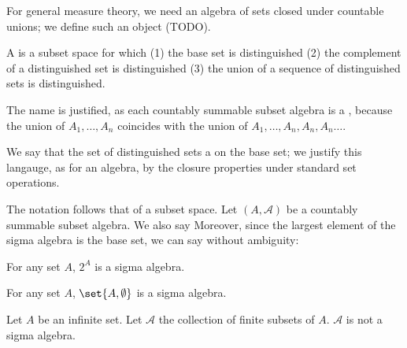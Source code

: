 
\sbasic



\sstart



For general measure theory,
we need an algebra of sets
closed under countable unions;
we define such an object (TODO).


A 
is a subset space for which
(1) the base set is distinguished
(2) the complement of a distinguished
set is distinguished
(3) the union of a sequence of distinguished sets
is distinguished.

The name is justified, as
each countably summable subset algebra is a
,
because the union of $A_1, \dots, A_n$
coincides with the union of
$A_1, \dots, A_n, A_n, A_n \dots$.

We say that the set of distinguished
sets a  on the
base set; we justify this langauge, as for
an algebra, by the closure properties
under standard set operations.


The notation follows that of a subset space.
Let $(A, \mathcal{A})$ be a countably summable
subset algebra.
We also say 
Moreover, since the largest element of the
sigma algebra is the base set, we can say without
ambiguity: 


\begin{expl}
  For any set $A$, $2^{A}$ is a sigma algebra.
\end{expl}

\begin{expl}
  For any set $A$,
  $\set{A, \emptyset}$ is a sigma algebra.
\end{expl}

\begin{expl}
  Let $A$ be an infinite set.
  Let $\mathcal{A}$ the collection
  of finite subsets of $A$.
  $\mathcal{A}$ is not a sigma algebra.
\end{expl}

